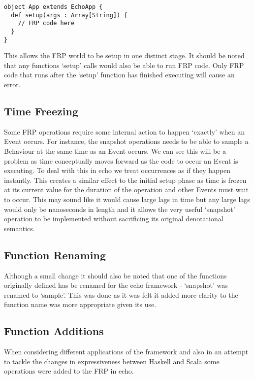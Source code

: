 \begin{verbatim}
object App extends EchoApp {
  def setup(args : Array[String]) {
    // FRP code here
  }
}
\end{verbatim}

      This allows the FRP world to be setup in one distinct stage. It should be noted that
      any functions `setup' calls would also be able to run FRP code. Only FRP code that runs
      after the `setup' function has finished executing will cause an error.
      
    \subsection{Time Freezing}
      Some FRP operations require some internal action to happen `exactly' when an Event occurs. For instance,
      the snapshot operations needs to be able to sample a Behaviour at the same time as an Event occurs.
      We can see this will be a problem as time conceptually moves forward as the code to
      occur an Event is executing. To deal with this in echo we treat occurrences as if they happen instantly. This
      creates a similar effect to the initial setup phase as time is frozen at its current value for the duration
      of the operation and other Events must wait to occur. This may sound like it would cause large lags in time
      but any large lags would only be nanoseconds in length and it allows the very useful `snapshot' operation
      to be implemented without sacrificing its original denotational semantics.
    
    \subsection{Function Renaming}
      Although a small change it should also be noted that one of the functions originally defined
      has be renamed for the echo framework - `snapshot' was renamed to `sample'. This was done as
      it was felt it added more clarity to the function name was more appropriate given its use.
      
    \subsection{Function Additions}
      When considering different applications of the framework and also in an attempt to
      tackle the changes in expressiveness between Haskell and Scala some operations
      were added to the FRP in echo.
      
